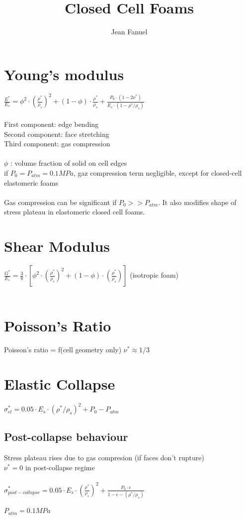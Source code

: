 \documentclass[12pt]{article}
\title{Closed Cell Foams}
\author{Jean Fanuel}
\begin{document}
\setlength{\parindent}{1cm}
\maketitle
\section{Young's modulus}
\Large
$\frac{E^*}{E_s} = \phi^2 \cdot (\frac{\rho^*} {\rho_s })^2 +
(1-\phi) \cdot \frac{\rho^*}{\rho_s}+
\frac{P_0 \cdot (1-2\nu^*)}{E_s\cdot (1- \rho^*/\rho_s)}$\\
\\
\normalsize
First component: edge bending\\
Second component: face stretching\\
Third component: gas compression\\
\\
$\phi$ : volume fraction of solid on cell edges\\
if $P_0 = P_{atm} = 0.1 MPa$, gaz compression term negligible, except for closed-cell
elastomeric foams\\
\\
Gas compression can be significant if $P_0 >> P_{atm}$. It also modifies shape of stress
plateau in elastomeric closed cell foams.

\section{Shear Modulus}
\Large
$\frac{G^*}{E_s} = \frac{3}{8} \cdot [\phi^2 \cdot (\frac{\rho^*}{\rho_s})^2 +
(1-\phi) \cdot (\frac{\rho^*}{\rho_s}) ]$
\normalsize (isotropic foam)\\
\\

\section{Poisson's Ratio}
Poisson's ratio = f(cell geometry only)
$\nu^*\approx 1/3$\\

\section{Elastic Collapse}
\Large
$\sigma^*_{el} = 0.05 \cdot E_s \cdot (\rho^* / \rho_s)^2 + P_0 - P_{atm}$\\
\normalsize

\subsection{Post-collapse behaviour}
Stress plateau rises due to gas compresion (if faces don't rupture)\\
$\nu^* = 0 $ in post-collapse regime\\
\\
\Large
$\sigma^*_{post-collapse} = 0.05 \cdot E_s \cdot (\frac{\rho^*}{\rho_s})^2 +
\frac{P_0 \cdot \epsilon}{1 - \epsilon -( \rho^* / \rho_s)}$\\
\\
\normalsize
$P_{atm}=0.1 MPa$\\
\end{document}
